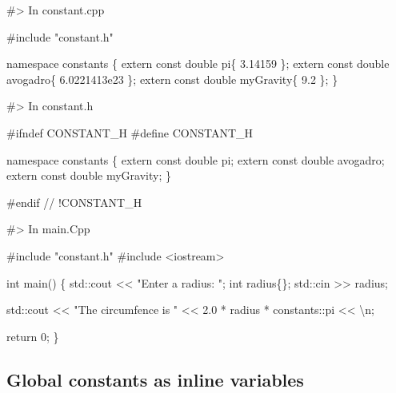 \documentclass[
  letterpaper,
  DIV=11,
  numbers=noendperiod]{scrreprt}
\newenvironment{Shaded}{\begin{snugshade}}{\end{snugshade}}
\newcommand{\CommentTok}[1]{\textcolor[rgb]{0.37,0.37,0.37}{#1}}
\newcommand{\DecValTok}[1]{\textcolor[rgb]{0.68,0.00,0.00}{#1}}
\newcommand{\ErrorTok}[1]{\textcolor[rgb]{0.68,0.00,0.00}{#1}}
\newcommand{\FloatTok}[1]{\textcolor[rgb]{0.68,0.00,0.00}{#1}}
\newcommand{\FunctionTok}[1]{\textcolor[rgb]{0.28,0.35,0.67}{#1}}
\newcommand{\NormalTok}[1]{\textcolor[rgb]{0.00,0.23,0.31}{#1}}
\newcommand{\SpecialCharTok}[1]{\textcolor[rgb]{0.37,0.37,0.37}{#1}}
\newcommand{\StringTok}[1]{\textcolor[rgb]{0.13,0.47,0.30}{#1}}
\begin{document}
\begin{Shaded}
\begin{Highlighting}[]
\CommentTok{\#\textgreater{} In constant.cpp}

\CommentTok{\#include "constant.h"}

\NormalTok{namespace constants}
\NormalTok{\{}
\NormalTok{    extern const double pi\{ }\FloatTok{3.14159}\NormalTok{ \};}
\NormalTok{    extern const double avogadro\{ }\FloatTok{6.0221413e23}\NormalTok{ \};}
\NormalTok{    extern const double myGravity\{ }\FloatTok{9.2}\NormalTok{ \};}
\NormalTok{\}}

\CommentTok{\#\textgreater{} In constant.h}

\CommentTok{\#ifndef CONSTANT\_H}
\CommentTok{\#define CONSTANT\_H}

\NormalTok{namespace constants}
\NormalTok{\{}
\NormalTok{    extern const double pi;}
\NormalTok{    extern const double avogadro;}
\NormalTok{    extern const double myGravity;}
\NormalTok{\}}

\CommentTok{\#endif // !CONSTANT\_H}

\CommentTok{\#\textgreater{} In main.Cpp}

\CommentTok{\#include "constant.h"}
\CommentTok{\#include \textless{}iostream\textgreater{}}

\NormalTok{int }\FunctionTok{main}\NormalTok{()}
\NormalTok{\{}
\NormalTok{    std}\SpecialCharTok{::}\NormalTok{cout }\SpecialCharTok{\textless{}}\ErrorTok{\textless{}} \StringTok{"Enter a radius: "}\NormalTok{;}
\NormalTok{    int radius\{\};}
\NormalTok{    std}\SpecialCharTok{::}\NormalTok{cin }\SpecialCharTok{\textgreater{}}\ErrorTok{\textgreater{}}\NormalTok{ radius;}

\NormalTok{    std}\SpecialCharTok{::}\NormalTok{cout }\SpecialCharTok{\textless{}}\ErrorTok{\textless{}} \StringTok{"The circumfence is "} \SpecialCharTok{\textless{}}\ErrorTok{\textless{}} \FloatTok{2.0} \SpecialCharTok{*}\NormalTok{ radius }\SpecialCharTok{*}\NormalTok{ constants}\SpecialCharTok{::}\NormalTok{pi }\SpecialCharTok{\textless{}}\ErrorTok{\textless{}} \StringTok{\textquotesingle{}}\SpecialCharTok{\textbackslash{}n}\StringTok{\textquotesingle{}}\NormalTok{;}

\NormalTok{    return }\DecValTok{0}\NormalTok{;}
\NormalTok{\}}
\end{Highlighting}
\end{Shaded}

\hypertarget{global-constants-as-inline-variables}{%
\subsection{Global constants as inline
variables}\label{global-constants-as-inline-variables}}
\end{document}
